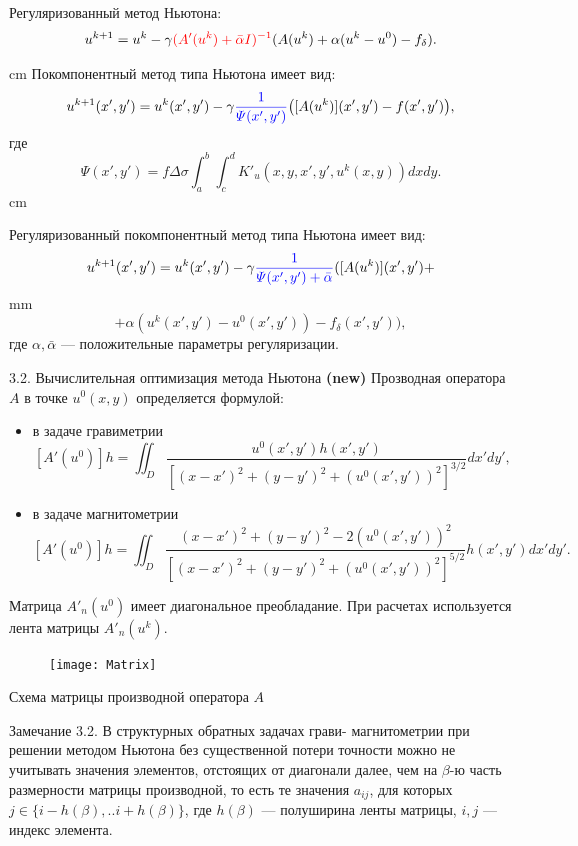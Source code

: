 \documentclass[10pt,pdf, mathserif, hyperref={unicode}]{beamer}
\begin{document}
\begin{frame}{}
	 Регуляризованный метод Ньютона:
	$$ u^{k+1}=u^k-\gamma{\color{red}(A'(u^k)+\bar\alpha I)^{-1}}(A(u^k)+\alpha(u^k-u^0)-f_\delta).$$

	 cm
	Покомпонентный метод типа Ньютона имеет вид:
	$$u^{k+1}(x',y')=u^k(x',y')-\gamma{\color{blue}\frac{1}{\varPsi(x',y')}}\big([A(u^k)](x',y')-f(x',y')\big),$$
	где $$\varPsi(x',y')=f\Delta\sigma\int_{a}^{b}\int_{c}^{d}K'_u(x,y, x',y',u^k(x,y)) dxdy.$$
	 cm

	Регуляризованный покомпонентный метод типа Ньютона имеет вид:
	$$u^{k+1}(x',y')=u^k(x',y')-\gamma{\color{blue}\frac{1}{\varPsi(x',y')+\bar{\alpha}}}([A(u^k)](x',y')+$$ 
 mm
	$$+\alpha (u^k(x',y')-u^0(x',y'))-f_\delta(x',y')),$$
	где $\alpha, \bar{\alpha}$ --- положительные параметры регуляризации.
	\let\thefootnote\relax\let\thefootnote\relax{}
\end{frame}

\begin{frame}{3.2. Вычислительная оптимизация метода Ньютона \textbf{(new)}}
	Прозводная оператора $A$ в точке $u^0(x,y)$ определяется формулой:
	\begin{itemize}
		\item в задаче гравиметрии
		$$ [A'(u^0)]h=\iint_{D} \frac{u^0(x',y')h(x',y')}{[(x-x')^2+(y-y')^2+(u^0(x',y'))^2]^{3/2}}dx'dy',$$
		\item в задаче магнитометрии
		$$ [A'(u^0)]h=\iint_{D} \frac{(x-x')^2+(y-y')^2-2(u^0(x',y'))^2}{[(x-x')^2+(y-y')^2+(u^0(x',y'))^2]^{5/2}}h(x',y')dx'dy'.$$
	\end{itemize}

Матрица $A'_n(u^0)$ имеет диагональное преобладание.
При расчетах используется лента матрицы $A'_n(u^k)$.
\begin{figure}
	\texttt{[image: Matrix]}
\end{figure}
\centering \scriptsize Схема матрицы производной оператора $A$
\end{frame}

\begin{frame}
	\begin{block}{Замечание 3.2.}
		В структурных обратных задачах грави- магнитометрии при решении методом Ньютона без существенной потери точности можно не учитывать значения элементов, отстоящих от диагонали далее, чем на  $\beta$-ю часть  размерности матрицы производной, то есть те значения $a_{ij}$, для которых  $j \in \{i-h(\beta),..i+h(\beta)\} $, где $h(\beta)$ --- полуширина ленты матрицы, $i, j$ --- индекс элемента.
	\end{block}
	\let\thefootnote\relax\let\thefootnote\relax{}
\end{frame}
\end{document}
